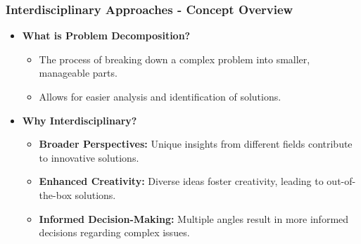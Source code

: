 \documentclass[aspectratio=169]{beamer}
\begin{document}
\begin{frame}[fragile]
    \frametitle{Interdisciplinary Approaches - Concept Overview}
    \begin{itemize}
        \item \textbf{What is Problem Decomposition?}
            \begin{itemize}
                \item The process of breaking down a complex problem into smaller, manageable parts.
                \item Allows for easier analysis and identification of solutions.
            \end{itemize}
        \item \textbf{Why Interdisciplinary?}
            \begin{itemize}
                \item \textbf{Broader Perspectives:} Unique insights from different fields contribute to innovative solutions.
                \item \textbf{Enhanced Creativity:} Diverse ideas foster creativity, leading to out-of-the-box solutions.
                \item \textbf{Informed Decision-Making:} Multiple angles result in more informed decisions regarding complex issues.
            \end{itemize}
    \end{itemize}
\end{frame}
\end{document}
